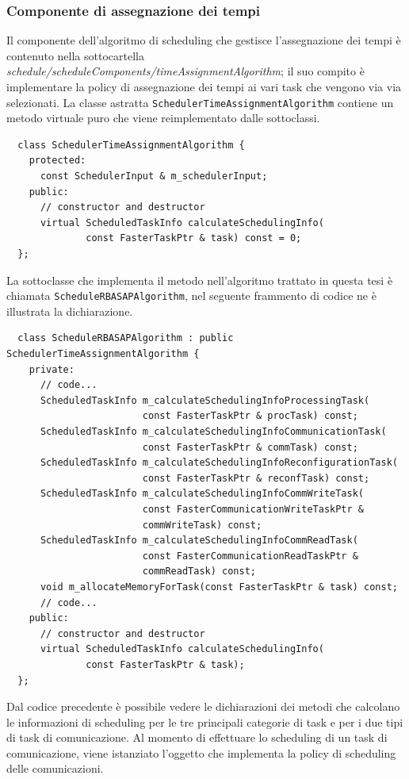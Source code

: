 \subsubsection{Componente di assegnazione dei tempi}
Il componente dell'algoritmo di scheduling che gestisce l'assegnazione dei 
tempi è contenuto nella sottocartella 
\emph{schedule/scheduleComponents/timeAssignmentAlgorithm}; il suo compito è 
implementare la policy di assegnazione dei tempi ai vari task che vengono via 
via selezionati. La classe astratta \verb+SchedulerTimeAssignmentAlgorithm+ 
contiene un metodo virtuale puro che viene reimplementato dalle sottoclassi.
\newline
\begin{verbatim}
  class SchedulerTimeAssignmentAlgorithm {
    protected:
      const SchedulerInput & m_schedulerInput;
    public:
      // constructor and destructor
      virtual ScheduledTaskInfo calculateSchedulingInfo(
              const FasterTaskPtr & task) const = 0;
  };
\end{verbatim}

La sottoclasse che implementa il metodo nell'algoritmo trattato in questa tesi 
è chiamata \verb+ScheduleRBASAPAlgorithm+, nel seguente frammento di codice ne 
è illustrata la dichiarazione.
\newline
\begin{verbatim}
  class ScheduleRBASAPAlgorithm : public SchedulerTimeAssignmentAlgorithm {
    private:
      // code...
      ScheduledTaskInfo m_calculateSchedulingInfoProcessingTask(
                        const FasterTaskPtr & procTask) const;
      ScheduledTaskInfo m_calculateSchedulingInfoCommunicationTask(
                        const FasterTaskPtr & commTask) const;
      ScheduledTaskInfo m_calculateSchedulingInfoReconfigurationTask(
                        const FasterTaskPtr & reconfTask) const;
      ScheduledTaskInfo m_calculateSchedulingInfoCommWriteTask(
                        const FasterCommunicationWriteTaskPtr &
                        commWriteTask) const;
      ScheduledTaskInfo m_calculateSchedulingInfoCommReadTask(
                        const FasterCommunicationReadTaskPtr &
                        commReadTask) const;
      void m_allocateMemoryForTask(const FasterTaskPtr & task) const;
      // code...
    public:
      // constructor and destructor
      virtual ScheduledTaskInfo calculateSchedulingInfo(
              const FasterTaskPtr & task);
  };
\end{verbatim}
Dal codice precedente è possibile vedere le dichiarazioni dei metodi che 
calcolano le informazioni di scheduling per le tre principali categorie di 
task e per i due tipi di task di comunicazione. Al momento di effettuare lo 
scheduling di un task di comunicazione, viene istanziato l'oggetto che 
implementa la policy di scheduling delle comunicazioni.

